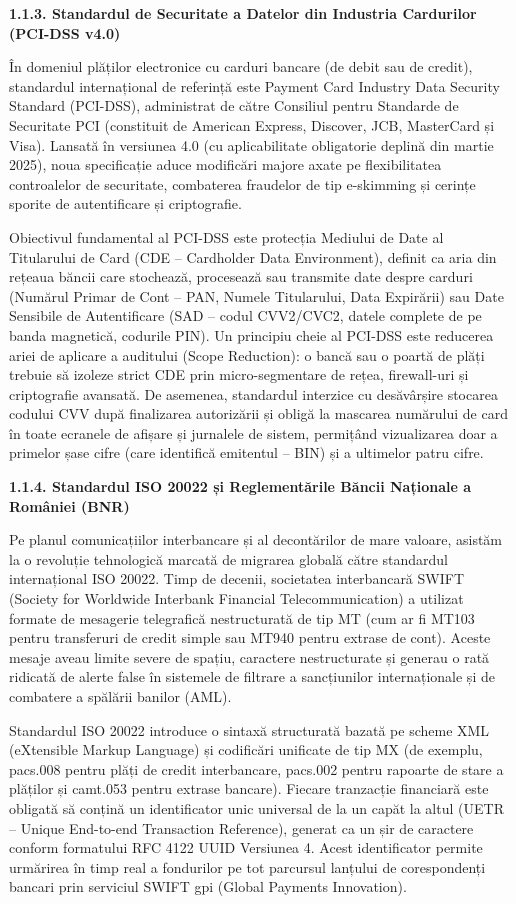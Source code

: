 \documentclass[
]{article}
\begin{document}
\textbf{1.1.3. Standardul de Securitate a Datelor din Industria
Cardurilor (PCI-DSS v4.0)}

În domeniul plăților electronice cu carduri bancare (de debit sau de
credit), standardul internațional de referință este Payment Card
Industry Data Security Standard (PCI-DSS), administrat de către
Consiliul pentru Standarde de Securitate PCI (constituit de American
Express, Discover, JCB, MasterCard și Visa). Lansată în versiunea 4.0
(cu aplicabilitate obligatorie deplină din martie 2025), noua
specificație aduce modificări majore axate pe flexibilitatea
controalelor de securitate, combaterea fraudelor de tip e-skimming și
cerințe sporite de autentificare și criptografie.

Obiectivul fundamental al PCI-DSS este protecția Mediului de Date al
Titularului de Card (CDE -- Cardholder Data Environment), definit ca
aria din rețeaua băncii care stochează, procesează sau transmite date
despre carduri (Numărul Primar de Cont -- PAN, Numele Titularului, Data
Expirării) sau Date Sensibile de Autentificare (SAD -- codul CVV2/CVC2,
datele complete de pe banda magnetică, codurile PIN). Un principiu cheie
al PCI-DSS este reducerea ariei de aplicare a auditului (Scope
Reduction): o bancă sau o poartă de plăți trebuie să izoleze strict CDE
prin micro-segmentare de rețea, firewall-uri și criptografie avansată.
De asemenea, standardul interzice cu desăvârșire stocarea codului CVV
după finalizarea autorizării și obligă la mascarea numărului de card în
toate ecranele de afișare și jurnalele de sistem, permițând vizualizarea
doar a primelor șase cifre (care identifică emitentul -- BIN) și a
ultimelor patru cifre.

\textbf{1.1.4. Standardul ISO 20022 și Reglementările Băncii Naționale a
României (BNR)}

Pe planul comunicațiilor interbancare și al decontărilor de mare
valoare, asistăm la o revoluție tehnologică marcată de migrarea globală
către standardul internațional ISO 20022. Timp de decenii, societatea
interbancară SWIFT (Society for Worldwide Interbank Financial
Telecommunication) a utilizat formate de mesagerie telegrafică
nestructurată de tip MT (cum ar fi MT103 pentru transferuri de credit
simple sau MT940 pentru extrase de cont). Aceste mesaje aveau limite
severe de spațiu, caractere nestructurate și generau o rată ridicată de
alerte false în sistemele de filtrare a sancțiunilor internaționale și
de combatere a spălării banilor (AML).

Standardul ISO 20022 introduce o sintaxă structurată bazată pe scheme
XML (eXtensible Markup Language) și codificări unificate de tip MX (de
exemplu, pacs.008 pentru plăți de credit interbancare, pacs.002 pentru
rapoarte de stare a plăților și camt.053 pentru extrase bancare).
Fiecare tranzacție financiară este obligată să conțină un identificator
unic universal de la un capăt la altul (UETR -- Unique End-to-end
Transaction Reference), generat ca un șir de caractere conform
formatului RFC 4122 UUID Versiunea 4. Acest identificator permite
urmărirea în timp real a fondurilor pe tot parcursul lanțului de
corespondenți bancari prin serviciul SWIFT gpi (Global Payments
Innovation).
\end{document}
